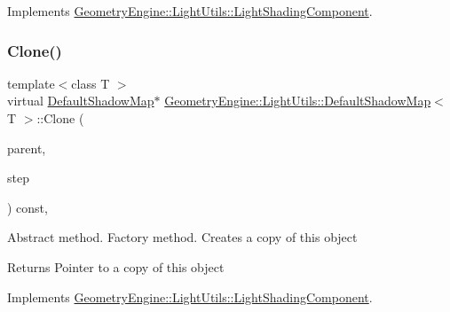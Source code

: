 Implements \mbox{\hyperlink{class_geometry_engine_1_1_light_utils_1_1_light_shading_component_a6684875f549753d00b91adbf62c88789}{Geometry\+Engine\+::\+Light\+Utils\+::\+Light\+Shading\+Component}}.

\mbox{\label{class_geometry_engine_1_1_light_utils_1_1_default_shadow_map_aa13953acd90de9f9567cee0951c64684}} 
\subsubsection{\texorpdfstring{Clone()}{Clone()}}
{\footnotesize\ttfamily template$<$class T $>$ \\
virtual \mbox{\hyperlink{class_geometry_engine_1_1_light_utils_1_1_default_shadow_map}{Default\+Shadow\+Map}}$\ast$ \mbox{\hyperlink{class_geometry_engine_1_1_light_utils_1_1_default_shadow_map}{Geometry\+Engine\+::\+Light\+Utils\+::\+Default\+Shadow\+Map}}$<$ T $>$\+::Clone (\begin{DoxyParamCaption}\item[{\mbox{\hyperlink{class_geometry_engine_1_1_light_utils_1_1_light_component_manager}{Light\+Component\+Manager}} $\ast$}]{parent,  }\item[{\mbox{\hyperlink{namespace_geometry_engine_1_1_light_utils_a16eb370137c2fd151e6f8e1d07cd23e0}{Light\+Shading}}}]{step }\end{DoxyParamCaption}) const\hspace{0.3cm}{\ttfamily [inline]}, {\ttfamily [virtual]}}

Abstract method. Factory method. Creates a copy of this object \begin{DoxyReturn}{Returns}
Pointer to a copy of this object 
\end{DoxyReturn}


Implements \mbox{\hyperlink{class_geometry_engine_1_1_light_utils_1_1_light_shading_component_a8f2107f451b130b6f4e7042cafbc8210}{Geometry\+Engine\+::\+Light\+Utils\+::\+Light\+Shading\+Component}}.

\mbox{\label{class_geometry_engine_1_1_light_utils_1_1_default_shadow_map_aabc10bddf31acc2e2e55588adca8bc90}} 
